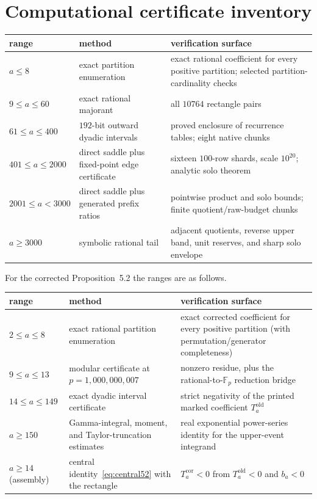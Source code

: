 \documentclass[11pt]{article}
\theoremstyle{definition}
\theoremstyle{remark}
\begin{document}
\section{Computational certificate inventory}\label{app:certs}

\begin{center}
\small
\begin{tabular}{p{}p{}p{}}
\toprule
range & method & verification surface\\
\midrule
$a\le8$ & exact partition enumeration & exact rational coefficient for every
positive partition; selected partition-cardinality checks\\
$9\le a\le60$ & exact rational majorant & all $10764$ rectangle pairs\\
$61\le a\le400$ & $192$-bit outward dyadic intervals & proved enclosure of
recurrence tables; eight native chunks\\
$401\le a\le2000$ & direct saddle plus fixed-point edge certificate & sixteen
$100$-row shards, scale $10^{20}$; analytic solo theorem\\
$2001\le a<3000$ & direct saddle plus generated prefix ratios & pointwise
product and solo bounds; finite quotient/raw-budget chunks\\
$a\ge3000$ & symbolic rational tail & adjacent quotients, reverse upper band,
unit reserves, and sharp solo envelope\\
\bottomrule
\end{tabular}
\end{center}

\noindent For the corrected Proposition~5.2 the ranges are as follows.

\begin{center}
\small
\begin{tabular}{p{}p{}p{}}
\toprule
range & method & verification surface\\
\midrule
$2\le a\le8$ & exact rational partition enumeration & exact corrected coefficient
for every positive partition (with permutation/generator completeness)\\
$9\le a\le13$ & modular certificate at $p=1{,}000{,}000{,}007$ & nonzero residue,
plus the rational-to-$\mathbb F_p$ reduction bridge\\
$14\le a\le149$ & exact dyadic interval certificate & strict negativity of the
printed marked coefficient $T_a^{\mathrm{old}}$\\
$a\ge150$ & Gamma-integral, moment, and Taylor-truncation estimates & real
exponential power-series identity for the upper-event integrand\\
$a\ge14$ (assembly) & central identity~\eqref{eq:central52} with the rectangle &
$T_a^{\mathrm{cor}}<0$ from $T_a^{\mathrm{old}}<0$ and $b_a<0$\\
\bottomrule
\end{tabular}
\end{center}
\end{document}
